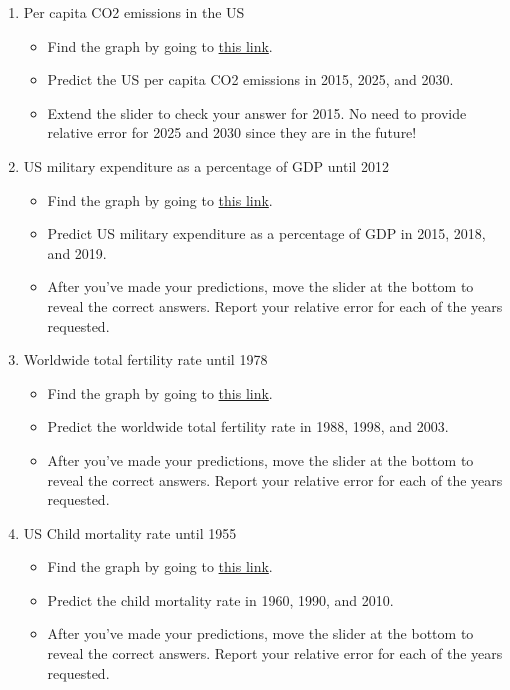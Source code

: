 \documentclass[11pt]{article}
\begin{document}
\begin{enumerate}
	\item Per capita CO2 emissions in the US
	\begin{itemize}
            \item Find the graph by going to       \href{https://ourworldindata.org/grapher/co-emissions-per-capita?tab=chart&time=1750..2010&country=~USA}{this link}.
		\item Predict the US per capita CO2 emissions in 2015, 2025, and 2030.
            \item Extend the slider to check your answer for 2015. No need to provide relative error for 2025 and 2030 since they are in the future!
	\end{itemize}
	
	\item US military expenditure as a percentage of GDP until 2012
	\begin{itemize}
             \item Find the graph by going to       \href{https://ourworldindata.org/grapher/military-expenditure-share-gdp?tab=chart&time=earliest..2012&country=~USA}{this link}.
		\item Predict US military expenditure as a percentage of GDP in 2015, 2018, and 2019.
            \item After you've made your predictions, move the slider at the bottom to reveal the correct answers. Report your relative error for each of the years requested.
                
	\end{itemize}
        
	\item Worldwide total fertility rate until 1978
	\begin{itemize}
		\item Find the graph by going to       \href{https://ourworldindata.org/grapher/children-per-woman-un?tab=chart&time=1950..1978}{this link}.
		\item Predict the worldwide total fertility rate in 1988, 1998, and 2003.
              \item After you've made your predictions, move the slider at the bottom to reveal the correct answers. Report your relative error for each of the years requested.
	\end{itemize}
	
	\item US Child mortality rate until 1955
	\begin{itemize}
		\item Find the graph by going to       \href{https://ourworldindata.org/grapher/child-mortality?time=earliest..1955&country=~USA}{this link}.
		\item Predict the child mortality rate in 1960, 1990, and 2010.
          \item After you've made your predictions, move the slider at the bottom to reveal the correct answers. Report your relative error for each of the years requested.
	\end{itemize}
\end{enumerate}
\end{document}
